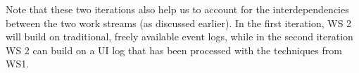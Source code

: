 Note that these two iterations also help us to account for the interdependencies between the two work streams (as discussed earlier). In the first iteration, WS 2 will build on traditional, freely available event logs, while in the second iteration WS 2 can build on a UI log that has been processed with the techniques from WS1. 



